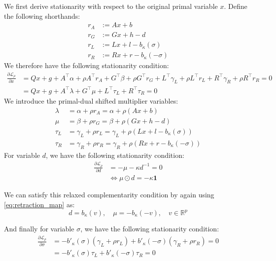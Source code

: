 \documentclass[11pt]{article}
\theoremstyle{plain}
\theoremstyle{definition}
\theoremstyle{remark}
\newcommand{\R}{\mathbb{R}}
\newcommand{\pd}[2]{\frac{\partial #1}{\partial #2}}  %
\begin{document}
We first derive stationarity with respect to the original primal variable $x$. Define the following 
shorthands:
\begin{align}
    r_A &:= Ax + b \\
    r_G &:= Gx + h - d \\
    r_L &:= Lx + l - b_\kappa(\sigma) \\
    r_R &:= Rx + r - b_\kappa(-\sigma)
\end{align}
We therefore have the following stationarity condition:
\begin{align}
\pd{\mathcal{L}_\rho}{x} &= Qx + g + A^\top \alpha + \rho A^\top r_A + G^\top \beta + \rho G^\top r_G + L^\top \gamma_L + \rho L^\top r_L + R^\top \gamma_R + \rho R^\top r_R = 0 \\
&= Qx + g + A^\top \lambda + G^\top \mu + L^\top \tau_L + R^\top \tau_R = 0
\end{align}
We introduce the primal-dual shifted multiplier variables:
\begin{align}
    \lambda &= \alpha + \rho r_A = \alpha + \rho (Ax + b) \\
    \mu &= \beta + \rho r_G = \beta + \rho (Gx + h - d) \\
    \tau_L &= \gamma_L + \rho r_L = \gamma_L + \rho (Lx + l - b_\kappa(\sigma)) \\
    \tau_R &= \gamma_R + \rho r_R = \gamma_R + \rho (Rx + r - b_\kappa(-\sigma))
\end{align}
For variable $d$, we have the following stationarity condition:
\begin{align}
\pd{\mathcal{L}_\rho}{d} &= -\mu - \kappa d^{-1} = 0 \\
&\Longleftrightarrow \mu \odot d = -\kappa \bm{1}
\end{align}

We can satisfy this relaxed complementarity condition by again using \eqref{eq:retraction_map} as:
\begin{equation}
    d = b_\kappa(v), \quad \mu = -b_\kappa(-v), \quad v \in \R^p
\end{equation}

And finally for variable $\sigma$, we have the following stationarity condition:
\begin{align}
\pd{\mathcal{L}_\rho}{\sigma} &= -b'_\kappa(\sigma) (\gamma_L + \rho r_L) + b'_\kappa(-\sigma) (\gamma_R + \rho r_R) = 0 \\
&= -b'_\kappa(\sigma) \tau_L + b'_\kappa(-\sigma) \tau_R = 0
\end{align}
\end{document}
